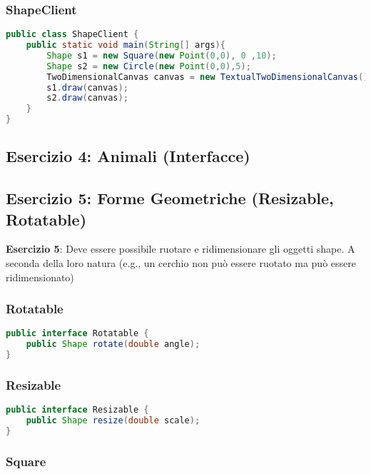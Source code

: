 \documentclass{article}
\begin{document}
\subsubsection{ShapeClient}
\begin{lstlisting}[language=Java,escapechar=|]
public class ShapeClient {
	public static void main(String[] args){
		Shape s1 = new Square(new Point(0,0), 0 ,10);
		Shape s2 = new Circle(new Point(0,0),5);
		TwoDimensionalCanvas canvas = new TextualTwoDimensionalCanvas();
		s1.draw(canvas);
		s2.draw(canvas);
	}
}
\end{lstlisting}



\subsection{Esercizio 4: Animali (Interfacce)}


\subsection{Esercizio 5: Forme Geometriche (Resizable, Rotatable)}
\begin{framed}
\textbf{Esercizio 5}: Deve essere possibile ruotare e ridimensionare gli oggetti shape. A seconda della loro natura (e.g., un cerchio non pu\`o essere ruotato ma pu\`o essere ridimensionato)
\end{framed}

\subsubsection{Rotatable}
\begin{lstlisting}[language=Java,escapechar=|]
public interface Rotatable {
	public Shape rotate(double angle);
}
\end{lstlisting}

\subsubsection{Resizable}
\begin{lstlisting}[language=Java,escapechar=|]
public interface Resizable {
	public Shape resize(double scale);
}
\end{lstlisting}

\subsubsection{Square}
\end{document}
